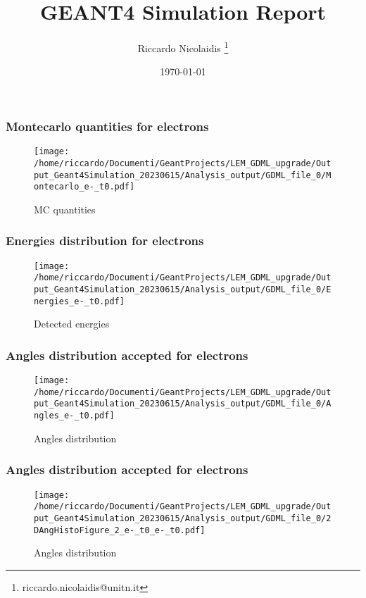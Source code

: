 \documentclass[8pt]{beamer}
\title{GEANT4 Simulation Report}
\author{Riccardo Nicolaidis \footnote{riccardo.nicolaidis@unitn.it}}
\date{\today}
\begin{document}
        
        \begin{frame}
            \titlepage
        \end{frame}
        
        \begin{frame}
            \frametitle{Montecarlo quantities for electrons}
        
        \begin{figure}[h]
            \centering
            \texttt{[image: /home/riccardo/Documenti/GeantProjects/LEM\_GDML\_upgrade/Output\_Geant4Simulation\_20230615/Analysis\_output/GDML\_file\_0/Montecarlo\_e-\_t0.pdf]}
            \caption{MC quantities}
        \end{figure}
        
        \end{frame}
        
        \begin{frame}
            \frametitle{Energies distribution for electrons}
        
        \begin{figure}[h]
            \centering
            \texttt{[image: /home/riccardo/Documenti/GeantProjects/LEM\_GDML\_upgrade/Output\_Geant4Simulation\_20230615/Analysis\_output/GDML\_file\_0/Energies\_e-\_t0.pdf]}
            \caption{Detected energies}
        \end{figure}
        
        \end{frame}
        
        \begin{frame}
            \frametitle{Angles distribution accepted for electrons}
        
        \begin{figure}[h]
            \centering
            \texttt{[image: /home/riccardo/Documenti/GeantProjects/LEM\_GDML\_upgrade/Output\_Geant4Simulation\_20230615/Analysis\_output/GDML\_file\_0/Angles\_e-\_t0.pdf]}
            \caption{Angles distribution}
        \end{figure}
        
        \end{frame}
        
        \begin{frame}
            \frametitle{Angles distribution accepted for electrons}
        
        \begin{figure}[h]
            \centering
            \texttt{[image: /home/riccardo/Documenti/GeantProjects/LEM\_GDML\_upgrade/Output\_Geant4Simulation\_20230615/Analysis\_output/GDML\_file\_0/2DAngHistoFigure\_2\_e-\_t0\_e-\_t0.pdf]}
            \caption{Angles distribution}
        \end{figure}
        
        \end{frame}
        
\end{document}
